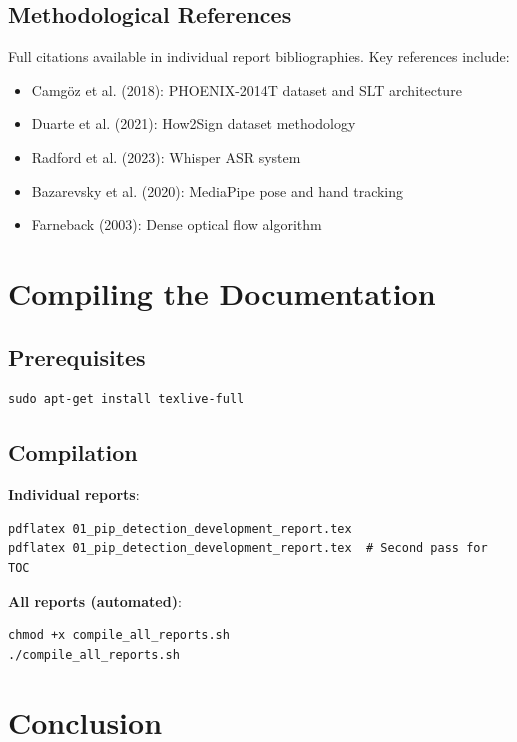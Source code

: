 \documentclass[11pt,a4paper]{article}
\begin{document}
\subsection{Methodological References}

Full citations available in individual report bibliographies. Key references include:

\begin{itemize}
    \item Camgöz et al. (2018): PHOENIX-2014T dataset and SLT architecture
    \item Duarte et al. (2021): How2Sign dataset methodology
    \item Radford et al. (2023): Whisper ASR system
    \item Bazarevsky et al. (2020): MediaPipe pose and hand tracking
    \item Farneback (2003): Dense optical flow algorithm
\end{itemize}

\section{Compiling the Documentation}

\subsection{Prerequisites}

\begin{verbatim}
sudo apt-get install texlive-full
\end{verbatim}

\subsection{Compilation}

\textbf{Individual reports}:
\begin{verbatim}
pdflatex 01_pip_detection_development_report.tex
pdflatex 01_pip_detection_development_report.tex  # Second pass for TOC
\end{verbatim}

\textbf{All reports (automated)}:
\begin{verbatim}
chmod +x compile_all_reports.sh
./compile_all_reports.sh
\end{verbatim}

\section{Conclusion}
\end{document}

